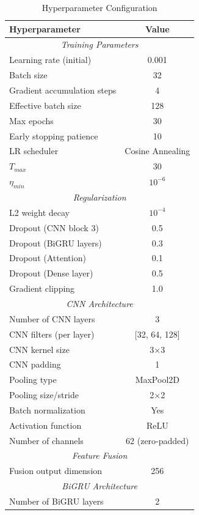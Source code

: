 \documentclass[conference]{IEEEtran}
\begin{document}
\begin{table}[!htbp]
\centering
\caption{Hyperparameter Configuration}
\label{tab:hyperparameters}
\begin{tabular}{lc}
\toprule
\textbf{Hyperparameter} & \textbf{Value} \\
\midrule
\multicolumn{2}{c}{\textit{Training Parameters}} \\
Learning rate (initial) & 0.001 \\
Batch size & 32 \\
Gradient accumulation steps & 4 \\
Effective batch size & 128 \\
Max epochs & 30 \\
Early stopping patience & 10 \\
LR scheduler & Cosine Annealing \\
$T_{max}$ & 30 \\
$\eta_{min}$ & $10^{-6}$ \\
\midrule
\multicolumn{2}{c}{\textit{Regularization}} \\
L2 weight decay & $10^{-4}$ \\
Dropout (CNN block 3) & 0.5 \\
Dropout (BiGRU layers) & 0.3 \\
Dropout (Attention) & 0.1 \\
Dropout (Dense layer) & 0.5 \\
Gradient clipping & 1.0 \\
\midrule
\multicolumn{2}{c}{\textit{CNN Architecture}} \\
Number of CNN layers & 3 \\
CNN filters (per layer) & [32, 64, 128] \\
CNN kernel size & 3$\times$3 \\
CNN padding & 1 \\
Pooling type & MaxPool2D \\
Pooling size/stride & 2$\times$2 \\
Batch normalization & Yes \\
Activation function & ReLU \\
Number of channels & 62 (zero-padded) \\
\midrule
\multicolumn{2}{c}{\textit{Feature Fusion}} \\
Fusion output dimension & 256 \\
\midrule
\multicolumn{2}{c}{\textit{BiGRU Architecture}} \\
Number of BiGRU layers & 2 \\

\end{tabular}
\end{table}
\end{document}
